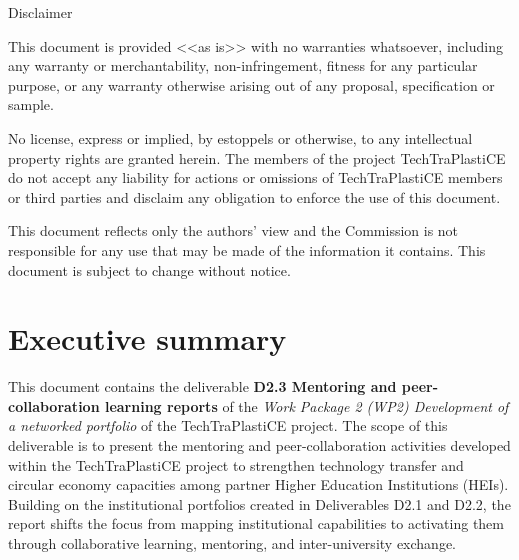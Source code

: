 \documentclass[
  12pt,
  oneside]{book}
\renewcommand*\contentsname{Table of contents}
\newcommand\contentsname{Table of contents}
\begin{document}
\begin{frontmatter}
\begin{titlepage}
  \vfill


  

    
    
    \vfill
    
    {\scriptsize\centering\color{lightgray} 
    
    Disclaimer
    
    This document is provided <<as is>> with no warranties whatsoever, 
    including any warranty or merchantability, non-infringement, fitness for any particular 
    purpose, or any warranty otherwise arising out of any proposal, specification or sample.  
    
    No license, express or implied, by estoppels or otherwise, to any intellectual 
    property rights are granted herein. 
    The members of the project TechTraPlastiCE do not accept any liability for actions or 
    omissions of TechTraPlastiCE members or third parties and disclaim any obligation 
    to enforce the use of this document. 
    
    This document reflects only the authors' view and the Commission is not responsible 
    for any use that may be made of the information it contains.  
    This document is subject to change without notice. 
    
    }
    \normalsize
    
    
    
      \end{titlepage}
  \end{frontmatter}

\renewcommand*\contentsname{Contents}
{
\setcounter{tocdepth}{2}
\tableofcontents
}
\listoffigures
\listoftables

\mainmatter
\chapter*{Executive summary}\label{executive-summary}

This document contains the deliverable \textbf{D2.3 Mentoring and
peer-collaboration learning reports} of the \emph{Work Package 2 (WP2)
Development of a networked portfolio} of the TechTraPlastiCE project.
The scope of this deliverable is to present the mentoring and
peer-collaboration activities developed within the TechTraPlastiCE
project to strengthen technology transfer and circular economy
capacities among partner Higher Education Institutions (HEIs). Building
on the institutional portfolios created in Deliverables D2.1 and D2.2,
the report shifts the focus from mapping institutional capabilities to
activating them through collaborative learning, mentoring, and
inter-university exchange.
\end{document}

